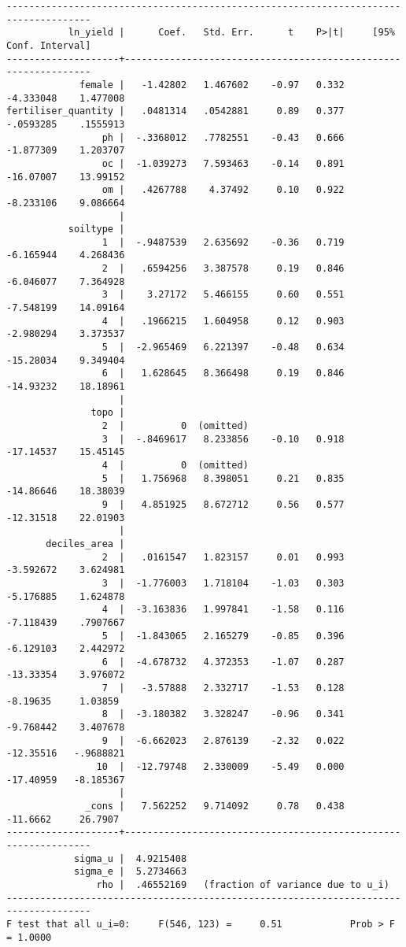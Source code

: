 \documentclass{article}
\begin{document}
\begin{lstlisting}
-------------------------------------------------------------------------------------
           ln_yield |      Coef.   Std. Err.      t    P>|t|     [95% Conf. Interval]
--------------------+----------------------------------------------------------------
             female |   -1.42802   1.467602    -0.97   0.332    -4.333048    1.477008
fertiliser_quantity |   .0481314   .0542881     0.89   0.377    -.0593285    .1555913
                 ph |  -.3368012   .7782551    -0.43   0.666    -1.877309    1.203707
                 oc |  -1.039273   7.593463    -0.14   0.891    -16.07007    13.99152
                 om |   .4267788    4.37492     0.10   0.922    -8.233106    9.086664
                    |
           soiltype |
                 1  |  -.9487539   2.635692    -0.36   0.719    -6.165944    4.268436
                 2  |   .6594256   3.387578     0.19   0.846    -6.046077    7.364928
                 3  |    3.27172   5.466155     0.60   0.551    -7.548199    14.09164
                 4  |   .1966215   1.604958     0.12   0.903    -2.980294    3.373537
                 5  |  -2.965469   6.221397    -0.48   0.634    -15.28034    9.349404
                 6  |   1.628645   8.366498     0.19   0.846    -14.93232    18.18961
                    |
               topo |
                 2  |          0  (omitted)
                 3  |  -.8469617   8.233856    -0.10   0.918    -17.14537    15.45145
                 4  |          0  (omitted)
                 5  |   1.756968   8.398051     0.21   0.835    -14.86646    18.38039
                 9  |   4.851925   8.672712     0.56   0.577    -12.31518    22.01903
                    |
       deciles_area |
                 2  |   .0161547   1.823157     0.01   0.993    -3.592672    3.624981
                 3  |  -1.776003   1.718104    -1.03   0.303    -5.176885    1.624878
                 4  |  -3.163836   1.997841    -1.58   0.116    -7.118439    .7907667
                 5  |  -1.843065   2.165279    -0.85   0.396    -6.129103    2.442972
                 6  |  -4.678732   4.372353    -1.07   0.287    -13.33354    3.976072
                 7  |   -3.57888   2.332717    -1.53   0.128     -8.19635     1.03859
                 8  |  -3.180382   3.328247    -0.96   0.341    -9.768442    3.407678
                 9  |  -6.662023   2.876139    -2.32   0.022    -12.35516   -.9688821
                10  |  -12.79748   2.330009    -5.49   0.000    -17.40959   -8.185367
                    |
              _cons |   7.562252   9.714092     0.78   0.438     -11.6662     26.7907
--------------------+----------------------------------------------------------------
            sigma_u |  4.9215408
            sigma_e |  5.2734663
                rho |  .46552169   (fraction of variance due to u_i)
-------------------------------------------------------------------------------------
F test that all u_i=0:     F(546, 123) =     0.51            Prob > F = 1.0000
\end{lstlisting}
\end{document}
